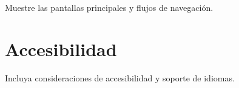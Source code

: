 Muestre las pantallas principales y flujos de navegación.
\section*{Accesibilidad}
Incluya consideraciones de accesibilidad y soporte de idiomas.
